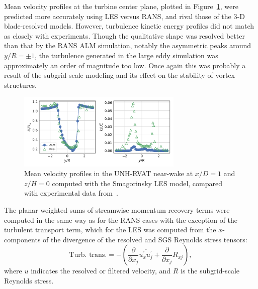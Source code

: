 \documentclass[times]{weauth}
\begin{document}
Mean velocity profiles at the turbine center plane, plotted in
Figure~\ref{fig:RVAT-ALM-LES-profiles}, were predicted more accurately using LES
versus RANS, and rival those of the 3-D blade-resolved models. However,
turbulence kinetic energy profiles did not match as closely with experiments.
Though the qualitative shape was resolved better than that by the RANS ALM
simulation, notably the asymmetric peaks around $y/R = \pm 1$, the turbulence
generated in the large eddy simulation was approximately an order of magnitude
too low. Once again this was probably a result of the subgrid-scale modeling and
its effect on the stability of vortex structures.

\begin{figure}
    \centering

    \includegraphics[width=0.7\textwidth]{RVAT-ALM-LES_wake-profiles}

    \caption{Mean velocity profiles in the UNH-RVAT near-wake at $x/D=1$ and
        $z/H=0$ computed with the Smagorinsky LES model, compared with experimental
        data from~\cite{Bachant2016-RVAT-Re-dep}.}

    \label{fig:RVAT-ALM-LES-profiles}
\end{figure}

The planar weighted sums of streamwise momentum recovery terms were computed in
the same way as for the RANS cases with the exception of the turbulent transport
term, which for the LES was computed from the $x$-components of the divergence
of the resolved and SGS Reynolds stress tensors:
\begin{equation}
    \text{Turb. trans.} = - \left( \frac{\partial}{\partial x_j}
    \overline{u^\prime_x u^\prime_j}
    + \frac{\partial}{\partial x_j} R_{xj}
    \right),
\end{equation}
where $u$ indicates the resolved or filtered velocity, and $R$ is the
subgrid-scale Reynolds stress.
\end{document}
